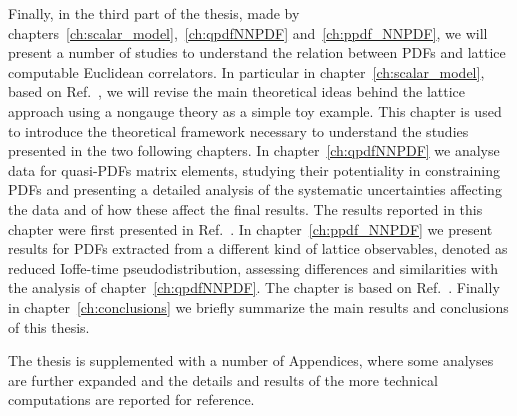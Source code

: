 %
Finally, in the third part of the thesis, made by chapters~\ref{ch:scalar_model},~\ref{ch:qpdfNNPDF} and~\ref{ch:ppdf_NNPDF}, 
we will present a number of studies to understand the relation between PDFs and lattice computable
Euclidean correlators.
In particular in chapter~\ref{ch:scalar_model}, based on Ref.~\cite{DelDebbio:2020cbz},
we will revise the main theoretical ideas behind the lattice approach
using a nongauge theory as a simple toy example. This chapter is used to introduce the theoretical framework necessary
to understand the studies presented in the two following chapters.
In chapter~\ref{ch:qpdfNNPDF} we analyse data for quasi-PDFs matrix elements, studying their potentiality
in constraining PDFs and presenting a detailed analysis of the systematic uncertainties affecting the data and of how
these affect the final results. The results reported in this chapter were first presented in Ref.~\cite{Cichy:2019ebf}.
In chapter~\ref{ch:ppdf_NNPDF} we present results for PDFs extracted from a different kind of lattice 
observables, denoted as reduced Ioffe-time pseudodistribution, assessing differences and similarities with
the analysis of chapter~\ref{ch:qpdfNNPDF}. The chapter is based on Ref.~\cite{DelDebbio:2020rgv}.
Finally in chapter~\ref{ch:conclusions} we briefly summarize the main results and conclusions of this thesis. 

The thesis is supplemented with a number of Appendices, where some analyses are further expanded and 
the details and results of the more technical computations are reported for reference. 




